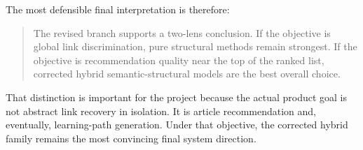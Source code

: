 \documentclass[11pt,a4paper]{article}
\begin{document}
The most defensible final interpretation is therefore:

\begin{quote}
The revised branch supports a two-lens conclusion. If the objective is global
link discrimination, pure structural methods remain strongest. If the objective
is recommendation quality near the top of the ranked list, corrected hybrid
semantic-structural models are the best overall choice.
\end{quote}

That distinction is important for the project because the actual product goal is
not abstract link recovery in isolation. It is article recommendation and,
eventually, learning-path generation. Under that objective, the corrected
hybrid family remains the most convincing final system direction.
\end{document}
